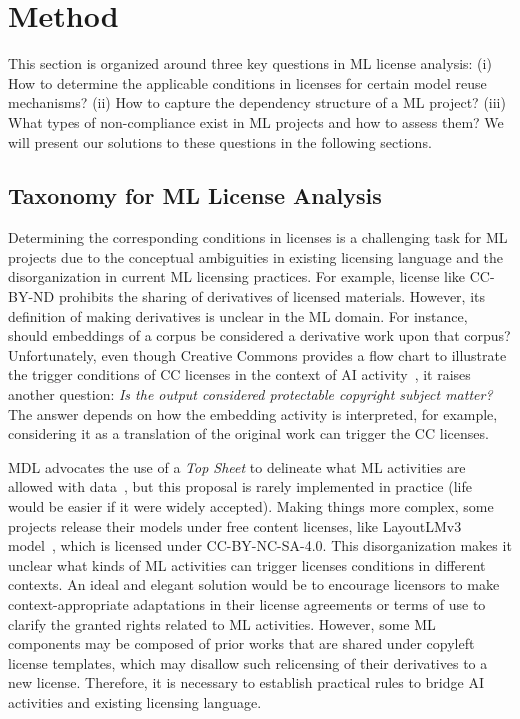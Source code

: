\section{Method}
\label{sec:method}
This section is organized around three key questions in ML license analysis: (i) How to determine the applicable conditions in licenses for certain model reuse mechanisms? (ii) How to capture the dependency structure of a ML project? (iii) What types of non-compliance exist in ML projects and how to assess them?
We will present our solutions to these questions in the following sections.

\subsection{Taxonomy for ML License Analysis}
Determining the corresponding conditions in licenses is a challenging task for ML projects due to the conceptual ambiguities in existing licensing language and the disorganization in current ML licensing practices.
For example, license like CC-BY-ND prohibits the sharing of derivatives of licensed materials.
However, its definition of making derivatives is unclear in the ML domain.
For instance, should embeddings of a corpus be considered a derivative work upon that corpus?
Unfortunately, even though Creative Commons provides a flow chart to illustrate the trigger conditions of CC licenses in the context of AI activity~\cite{creative2023artificial}, it raises another question: \textit{Is the output considered protectable copyright subject matter?}
The answer depends on how the embedding activity is interpreted, for example, considering it as a translation of the original work can trigger the CC licenses.

MDL advocates the use of a \textit{Top Sheet} to delineate what ML activities are allowed with data~\cite{benjamin2019towards}, but this proposal is rarely implemented in practice (life would be easier if it were widely accepted). 
Making things more complex, some projects release their models under free content licenses, like LayoutLMv3 model~\cite{huang2022layoutlmv3}, which is licensed under CC-BY-NC-SA-4.0. 
This disorganization makes it unclear what kinds of ML activities can trigger licenses conditions in different contexts.
An ideal and elegant solution would be to encourage licensors to make context-appropriate adaptations in their license agreements or terms of use to clarify the granted rights related to ML activities. 
However, some ML components may be composed of prior works that are shared under copyleft license templates, which may disallow such relicensing of their derivatives to a new license.
Therefore, it is necessary to establish practical rules to bridge AI activities and existing licensing language.

